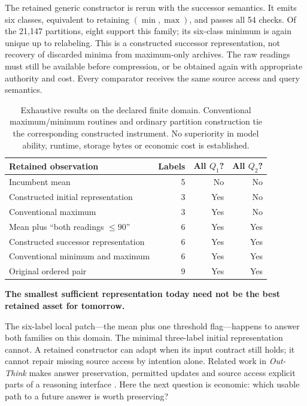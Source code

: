 The retained generic constructor is rerun with the successor semantics. It emits six classes, equivalent to retaining $(\min,\max)$, and passes all 54 checks. Of the 21,147 partitions, eight support this family; its six-class minimum is again unique up to relabeling. This is a constructed successor representation, not recovery of discarded minima from maximum-only archives. The raw readings must still be available before compression, or be obtained again with appropriate authority and cost. Every comparator receives the same source access and query semantics.

\begin{table}[htbp]
\centering\small
\begin{tabularx}{\textwidth}{Yrrr}
\toprule
\textbf{Retained observation} & \textbf{Labels} & \textbf{All $Q_1$?} & \textbf{All $Q_2$?}\\
\midrule
Incumbent mean & 5 & No & No\\
Constructed initial representation & 3 & Yes & No\\
Conventional maximum & 3 & Yes & No\\
Mean plus ``both readings $\leq90$'' & 6 & Yes & Yes\\
Constructed successor representation & 6 & Yes & Yes\\
Conventional minimum and maximum & 6 & Yes & Yes\\
Original ordered pair & 9 & Yes & Yes\\
\bottomrule
\end{tabularx}
\caption{Exhaustive results on the declared finite domain. Conventional maximum/minimum routines and ordinary partition construction tie the corresponding constructed instrument. No superiority in model ability, runtime, storage bytes or economic cost is established.}
\label{tab:construction}
\end{table}

\begin{thesisbox}
\textbf{The smallest sufficient representation today need not be the best retained asset for tomorrow.}
\end{thesisbox}
The six-label local patch---the mean plus one threshold flag---happens to answer both families on this domain. The minimal three-label initial representation cannot. A retained constructor can adapt when its input contract still holds; it cannot repair missing source access by intention alone. Related work in \emph{Out-Think} makes answer preservation, permitted updates and source access explicit parts of a reasoning interface \citep[\S2--3]{boucher_think}. Here the next question is economic: which usable path to a future answer is worth preserving?

